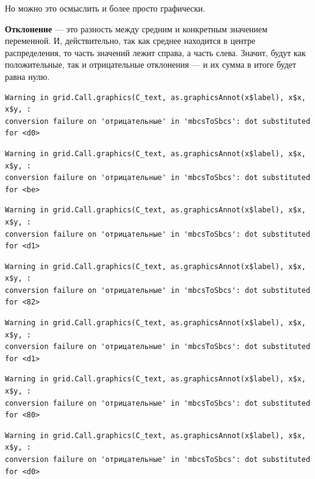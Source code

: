 \documentclass[
  letterpaper,
]{scrbook}
\theoremstyle{definition}
\theoremstyle{remark}
\begin{document}
Но можно это осмыслить и более просто графически.

\textbf{Отклонение} --- это разность между средним и конкретным
значением переменной. И, действительно, так как среднее находится в
центре распределения, то часть значений лежит справа, а часть слева.
Значит, будут как положительные, так и отрицательные отклонения --- и их
сумма в итоге будет равна нулю.

\begin{verbatim}
Warning in grid.Call.graphics(C_text, as.graphicsAnnot(x$label), x$x, x$y, :
conversion failure on 'отрицательные' in 'mbcsToSbcs': dot substituted for <d0>
\end{verbatim}

\begin{verbatim}
Warning in grid.Call.graphics(C_text, as.graphicsAnnot(x$label), x$x, x$y, :
conversion failure on 'отрицательные' in 'mbcsToSbcs': dot substituted for <be>
\end{verbatim}

\begin{verbatim}
Warning in grid.Call.graphics(C_text, as.graphicsAnnot(x$label), x$x, x$y, :
conversion failure on 'отрицательные' in 'mbcsToSbcs': dot substituted for <d1>
\end{verbatim}

\begin{verbatim}
Warning in grid.Call.graphics(C_text, as.graphicsAnnot(x$label), x$x, x$y, :
conversion failure on 'отрицательные' in 'mbcsToSbcs': dot substituted for <82>
\end{verbatim}

\begin{verbatim}
Warning in grid.Call.graphics(C_text, as.graphicsAnnot(x$label), x$x, x$y, :
conversion failure on 'отрицательные' in 'mbcsToSbcs': dot substituted for <d1>
\end{verbatim}

\begin{verbatim}
Warning in grid.Call.graphics(C_text, as.graphicsAnnot(x$label), x$x, x$y, :
conversion failure on 'отрицательные' in 'mbcsToSbcs': dot substituted for <80>
\end{verbatim}

\begin{verbatim}
Warning in grid.Call.graphics(C_text, as.graphicsAnnot(x$label), x$x, x$y, :
conversion failure on 'отрицательные' in 'mbcsToSbcs': dot substituted for <d0>
\end{verbatim}
\end{document}
